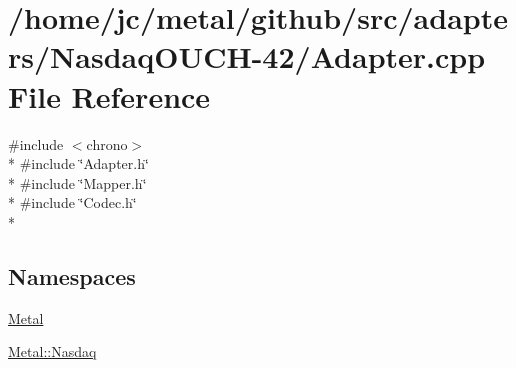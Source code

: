 \hypertarget{adapters_2NasdaqOUCH-42_2Adapter_8cpp}{}\section{/home/jc/metal/github/src/adapters/\+Nasdaq\+O\+U\+C\+H-\/42/\+Adapter.cpp File Reference}
\label{adapters_2NasdaqOUCH-42_2Adapter_8cpp}
{\ttfamily \#include $<$chrono$>$}\\*
{\ttfamily \#include \char`\"{}Adapter.\+h\char`\"{}}\\*
{\ttfamily \#include \char`\"{}Mapper.\+h\char`\"{}}\\*
{\ttfamily \#include \char`\"{}Codec.\+h\char`\"{}}\\*
\subsection*{Namespaces}
\begin{DoxyCompactItemize}
\item 
 \hyperlink{namespaceMetal}{Metal}
\item 
 \hyperlink{namespaceMetal_1_1Nasdaq}{Metal\+::\+Nasdaq}
\end{DoxyCompactItemize}
